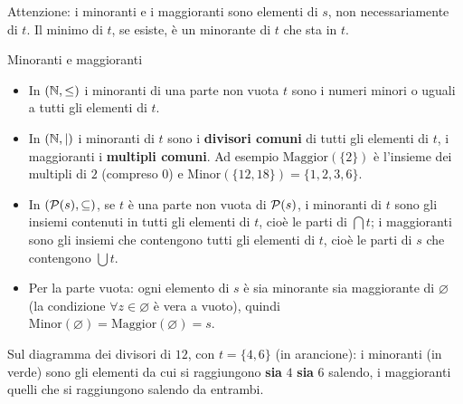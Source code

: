 Attenzione: i minoranti e i maggioranti sono elementi di $s$, non necessariamente di $t$. Il minimo di $t$, se esiste, è un
minorante di $t$ che sta in $t$.

\begin{esempio}{Minoranti e maggioranti}
    \begin{itemize}
        \item In $(\mathbb{N}, \leq)$ i minoranti di una parte non vuota $t$ sono i numeri minori o uguali a tutti gli elementi di $t$.
        \item In $(\mathbb{N}, \mid)$ i minoranti di $t$ sono i \textbf{divisori comuni} di tutti gli elementi di $t$, i maggioranti i
              \textbf{multipli comuni}. Ad esempio $\mathrm{Maggior}(\{2\})$ è l'insieme dei multipli di $2$ (compreso $0$) e
              $\mathrm{Minor}(\{12, 18\}) = \{1, 2, 3, 6\}$.
        \item In $(\mathcal{P}(s), \subseteq)$, se $t$ è una parte non vuota di $\mathcal{P}(s)$, i minoranti di $t$ sono gli insiemi contenuti in tutti
              gli elementi di $t$, cioè le parti di $\bigcap t$; i maggioranti sono gli insiemi che contengono tutti gli elementi di $t$,
              cioè le parti di $s$ che contengono $\bigcup t$.
        \item Per la parte vuota: ogni elemento di $s$ è sia minorante sia maggiorante di $\varnothing$ (la condizione $\forall z \in \varnothing$
              è vera a vuoto), quindi $\mathrm{Minor}(\varnothing) = \mathrm{Maggior}(\varnothing) = s$.
    \end{itemize}
    Sul diagramma dei divisori di $12$, con $t = \{4, 6\}$ (in arancione): i minoranti (in verde) sono gli elementi da cui si
    raggiungono \textbf{sia} $4$ \textbf{sia} $6$ salendo, i maggioranti quelli che si raggiungono salendo da entrambi.
    \begin{center}
    \end{center}
\end{esempio}
